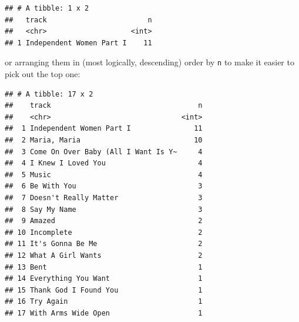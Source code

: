 \documentclass[]{tufte-book}
\newenvironment{Shaded}{}{}
\newcommand{\DataTypeTok}[1]{\textcolor[rgb]{0.56,0.13,0.00}{#1}}
\newcommand{\DecValTok}[1]{\textcolor[rgb]{0.25,0.63,0.44}{#1}}
\newcommand{\KeywordTok}[1]{\textcolor[rgb]{0.00,0.44,0.13}{\textbf{#1}}}
\newcommand{\NormalTok}[1]{#1}
\newcommand{\OperatorTok}[1]{\textcolor[rgb]{0.40,0.40,0.40}{#1}}
\newcommand{\StringTok}[1]{\textcolor[rgb]{0.25,0.44,0.63}{#1}}
\theoremstyle{definition}
\theoremstyle{definition}
\theoremstyle{definition}
\theoremstyle{remark}
\begin{document}
\begin{verbatim}
## # A tibble: 1 x 2
##   track                        n
##   <chr>                    <int>
## 1 Independent Women Part I    11
\end{verbatim}

or arranging them in (most logically, descending) order by \texttt{n} to
make it easier to pick out the top one:

\begin{Shaded}
\end{Shaded}

\begin{verbatim}
## # A tibble: 17 x 2
##    track                                   n
##    <chr>                               <int>
##  1 Independent Women Part I               11
##  2 Maria, Maria                           10
##  3 Come On Over Baby (All I Want Is Y~     4
##  4 I Knew I Loved You                      4
##  5 Music                                   4
##  6 Be With You                             3
##  7 Doesn't Really Matter                   3
##  8 Say My Name                             3
##  9 Amazed                                  2
## 10 Incomplete                              2
## 11 It's Gonna Be Me                        2
## 12 What A Girl Wants                       2
## 13 Bent                                    1
## 14 Everything You Want                     1
## 15 Thank God I Found You                   1
## 16 Try Again                               1
## 17 With Arms Wide Open                     1
\end{verbatim}
\end{document}
